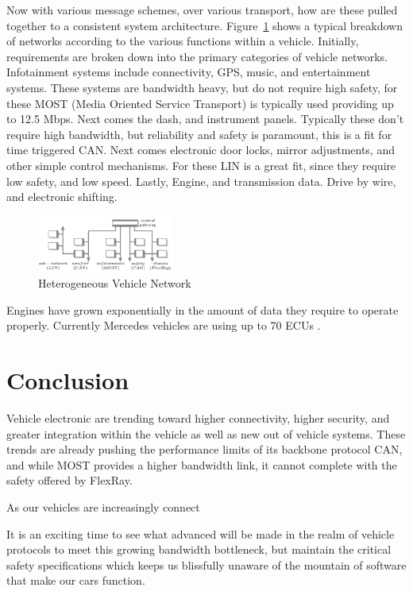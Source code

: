 \documentclass[conference,12pt]{IEEEtran}
\begin{document}
Now with various message schemes, over various transport, how are these pulled
together to a consistent system architecture.
Figure~\ref{fig:heterogenous_network} shows a typical breakdown of networks
according to the various functions within a vehicle. Initially, requirements are
broken down into the primary categories of vehicle networks.  Infotainment
systems include connectivity, GPS, music, and entertainment systems. These
systems are bandwidth heavy, but do not require high safety, for these MOST
(Media Oriented Service Transport) is typically used providing up to 12.5 Mbps.
Next comes the dash, and instrument panels. Typically these don't require high
bandwidth, but reliability and safety is paramount, this is a fit for time
triggered CAN.  Next comes electronic door locks, mirror adjustments, and other
simple control mechanisms. For these LIN is a great fit, since they require low
safety, and low speed.  Lastly, Engine, and transmission data. Drive by wire,
and electronic shifting. 
\begin{figure}
  \centering
  \includegraphics[width=0.4\textwidth]{network_topography.png}
  \caption{Heterogeneous Vehicle Network \autocite{lukasiewycz_system_2013}}
  \label{fig:heterogenous_network}
\end{figure}

Engines have grown exponentially in the amount of data they require to operate
properly. Currently Mercedes vehicles are using up to 70 ECUs
\autocite{guo_integrated_2009}.

\section{Conclusion}
Vehicle electronic are trending toward higher connectivity, higher security, and
greater integration within the vehicle as well as new out of vehicle systems.
These trends are already pushing the performance limits of its backbone protocol
CAN, and while MOST provides a higher bandwidth link, it cannot complete with
the safety offered by FlexRay.

As our vehicles are increasingly connect

It is an exciting time to see what advanced will be
made in the realm of vehicle protocols to meet this growing bandwidth bottleneck,
but maintain the critical safety specifications which keeps us blissfully unaware
of the mountain of software that make our cars function. 

\printbibliography
\end{document}
